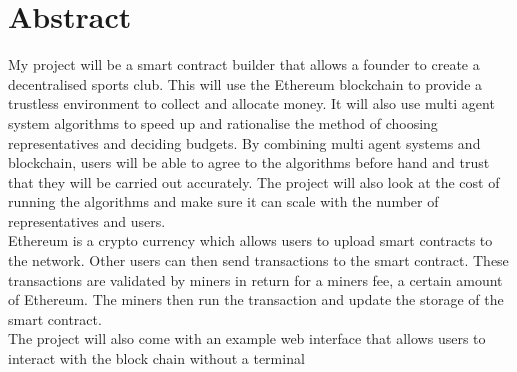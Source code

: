 \chapter{Abstract} \label{Chapter: Abstract}
My project will be a smart contract builder that allows a founder to create a decentralised sports club. This will use the Ethereum blockchain to provide a trustless environment to collect and allocate money.  It will also use multi agent system algorithms to speed up and rationalise the method of choosing representatives and deciding budgets. By combining multi agent systems and blockchain, users will be able to agree to the algorithms before hand and trust that they will be carried out accurately. The project will also look at the cost of running the algorithms and make sure it can scale with the number of representatives and users. \\
Ethereum is a crypto currency which allows users to upload smart contracts to the network. Other users can then send transactions to the smart contract. These transactions are validated by miners in return for a miners fee, a certain amount of Ethereum. The miners then run the transaction and update the storage of the smart contract.\\
The project will also come with an example web interface that allows users to interact with the block chain without a terminal
